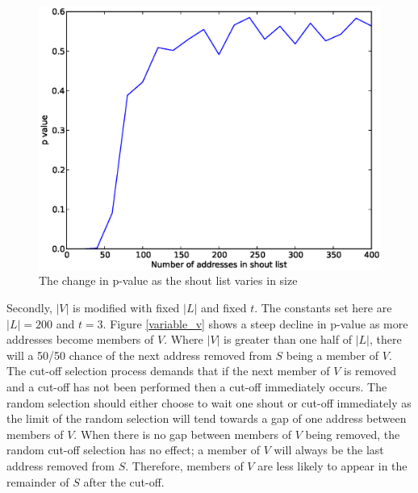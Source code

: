 \documentclass[ %
                    author={Luke Murray},
                supervisor={Dr. Simon Hollis},
                     title={Shadow Peer-to-Peer Networks},
                  subtitle={},
                    degree={MEng},
                      year={2013} ]{thesis}
\begin{document}
\begin{figure}[h]
    \centering
    \begin{minipage}[b]{0.8\linewidth}
        \centering
        \includegraphics[width=\linewidth]{diagrams/variable_l.eps}
        \caption{The change in p-value as the shout list varies in size}
    \end{minipage}
    \label{variable_l}
\end{figure}

Secondly, $|V|$ is modified with fixed $|L|$ and fixed $t$. The constants set here are $|L| = 200$ and $t = 3$. Figure \ref{variable_v} shows a steep decline in p-value as more addresses become members of $V$. Where $|V|$ is greater than one half of $|L|$, there will a 50/50 chance of the next address removed from $S$ being a member of $V$. The cut-off selection process demands that if the next member of $V$ is removed and a cut-off has not been performed then a cut-off immediately occurs. The random selection should either choose to wait one shout or cut-off immediately as the limit of the random selection will tend towards a gap of one address between members of $V$. When there is no gap between members of $V$ being removed, the random cut-off selection has no effect; a member of $V$ will always be the last address removed from $S$. Therefore, members of $V$ are less likely to appear in the remainder of $S$ after the cut-off.
\end{document}
